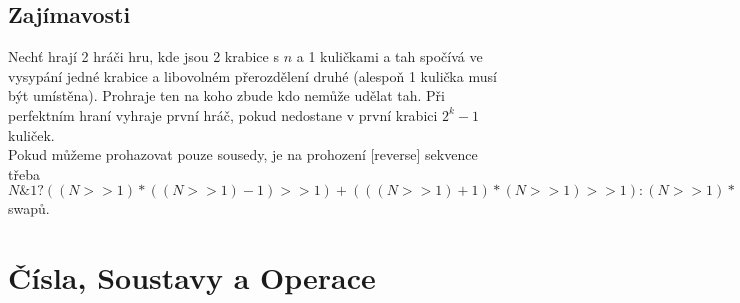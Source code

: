 \documentclass[11pt]{article}
\begin{document}
\subsection{Zajímavosti}
Nechť hrají 2 hráči hru, kde jsou 2 krabice s $n$ a 1 kuličkami a tah spočívá ve vysypání jedné krabice a libovolném přerozdělení druhé (alespoň 1 kulička musí být umístěna). Prohraje ten na koho zbude kdo nemůže udělat tah. Při perfektním hraní vyhraje první hráč, pokud nedostane v první krabici $2^k-1$ kuliček.
\\Pokud můžeme prohazovat pouze sousedy, je na prohození [reverse] sekvence třeba $N\&1?((N>>1)*((N>>1)-1)>>1)+(((N>>1)+1)*(N>>1)>>1):(N>>1)*((N>>1)-1)$ swapů.
\newpage\section{Čísla, Soustavy a Operace}
\end{document}
